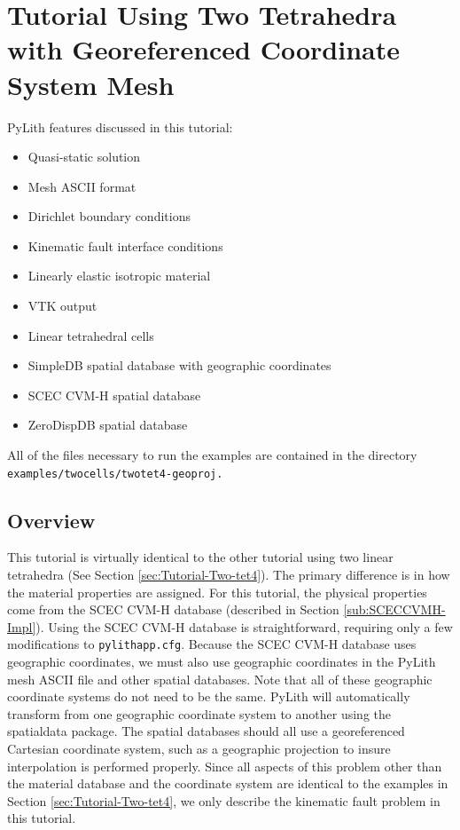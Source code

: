 
\section{\label{sec:Tutorial-Two-tet4-geoproj}Tutorial Using Two Tetrahedra
with Georeferenced Coordinate System Mesh}

PyLith features discussed in this tutorial:
\begin{itemize}
\item Quasi-static solution
\item Mesh ASCII format
\item Dirichlet boundary conditions
\item Kinematic fault interface conditions
\item Linearly elastic isotropic material
\item VTK output
\item Linear tetrahedral cells
\item SimpleDB spatial database with geographic coordinates
\item SCEC CVM-H spatial database
\item ZeroDispDB spatial database
\end{itemize}
All of the files necessary to run the examples are contained in the
directory \texttt{examples/twocells/twotet4-geoproj.}


\subsection{Overview}

This tutorial is virtually identical to the other tutorial using two
linear tetrahedra (See Section \ref{sec:Tutorial-Two-tet4}). The
primary difference is in how the material properties are assigned.
For this tutorial, the physical properties come from the SCEC CVM-H
database (described in Section \ref{sub:SCECCVMH-Impl}). Using the
SCEC CVM-H database is straightforward, requiring only a few modifications
to \texttt{pylithapp.cfg}. Because the SCEC CVM-H database uses geographic
coordinates, we must also use geographic coordinates in the PyLith
mesh ASCII file and other spatial databases. Note that all of these
geographic coordinate systems do not need to be the same. PyLith will
automatically transform from one geographic coordinate system to another
using the spatialdata package. The spatial databases should all use
a georeferenced Cartesian coordinate system, such as a geographic
projection to insure interpolation is performed properly. Since all
aspects of this problem other than the material database and the coordinate
system are identical to the examples in Section \ref{sec:Tutorial-Two-tet4},
we only describe the kinematic fault problem in this tutorial.


